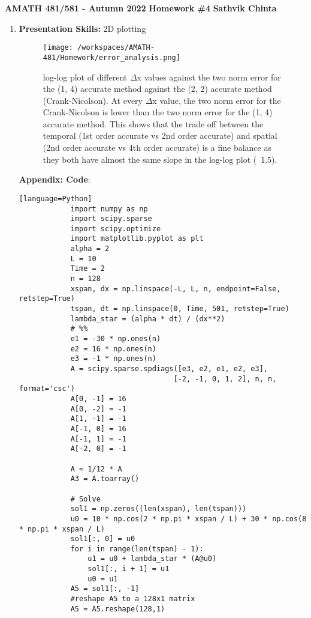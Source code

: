 \documentclass[a4paper,12pt, fleqn]{article}
\begin{document}
\begin{center}
\Large
\textbf{AMATH 481/581 - Autumn 2022}
\textbf{Homework \#4}
\textbf{Sathvik Chinta}
\normalsize
\end{center}
\begin{enumerate}
    \item 
        \textbf{Presentation Skills:} 2D plotting \\
        \begin{figure}[H]
            \centering
            \texttt{[image: /workspaces/AMATH-481/Homework/error\_analysis.png]}
            \caption{log-log plot of different $\Delta$x values against the two norm error for the (1, 4) accurate method
            against the (2, 2) accurate method (Crank-Nicolson). At every $\Delta$x value, the two norm error 
            for the Crank-Nicolson is lower than the two norm error for the (1, 4) accurate method. This shows that
            the trade off between the temporal (1st order accurate vs 2nd order accurate) and spatial (2nd order accurate vs 4th order accurate)
            is a fine balance as they both have almost the same slope in the log-log plot (~1.5).}
            \label{fig:hw4-1a}
        \end{figure}
        
        \textbf{Appendix: Code}: \\
        \begin{lstlisting}[basicstyle=\tiny]
        [language=Python]
            import numpy as np
            import scipy.sparse
            import scipy.optimize
            import matplotlib.pyplot as plt
            alpha = 2
            L = 10
            Time = 2
            n = 128
            xspan, dx = np.linspace(-L, L, n, endpoint=False, retstep=True)
            tspan, dt = np.linspace(0, Time, 501, retstep=True)
            lambda_star = (alpha * dt) / (dx**2)
            # %%
            e1 = -30 * np.ones(n)
            e2 = 16 * np.ones(n)
            e3 = -1 * np.ones(n)
            A = scipy.sparse.spdiags([e3, e2, e1, e2, e3],
                                    [-2, -1, 0, 1, 2], n, n, format='csc')
            A[0, -1] = 16
            A[0, -2] = -1
            A[1, -1] = -1
            A[-1, 0] = 16
            A[-1, 1] = -1
            A[-2, 0] = -1

            A = 1/12 * A
            A3 = A.toarray()

            # Solve
            sol1 = np.zeros((len(xspan), len(tspan)))
            u0 = 10 * np.cos(2 * np.pi * xspan / L) + 30 * np.cos(8 * np.pi * xspan / L)
            sol1[:, 0] = u0
            for i in range(len(tspan) - 1):
                u1 = u0 + lambda_star * (A@u0)
                sol1[:, i + 1] = u1 
                u0 = u1
            A5 = sol1[:, -1]
            #reshape A5 to a 128x1 matrix
            A5 = A5.reshape(128,1)


\end{lstlisting}
\end{enumerate}
\end{document}
